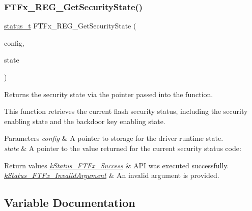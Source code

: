 \subsubsection{\texorpdfstring{FTFx\_REG\_GetSecurityState()}{FTFx\_REG\_GetSecurityState()}}
{\footnotesize\ttfamily \mbox{\hyperlink{group__ksdk__common_gaaabdaf7ee58ca7269bd4bf24efcde092}{status\+\_\+t}} F\+T\+Fx\+\_\+\+R\+E\+G\+\_\+\+Get\+Security\+State (\begin{DoxyParamCaption}\item[{\mbox{\hyperlink{group__ftfx__controller_gab0196063c05bffb4cd2f249699a3378c}{ftfx\+\_\+config\+\_\+t}} $\ast$}]{config,  }\item[{\mbox{\hyperlink{group__ftfx__controller_gae49df85d158f3651e17d1bb660a4f1c2}{ftfx\+\_\+security\+\_\+state\+\_\+t}} $\ast$}]{state }\end{DoxyParamCaption})}



Returns the security state via the pointer passed into the function. 

This function retrieves the current flash security status, including the security enabling state and the backdoor key enabling state.


\begin{DoxyParams}{Parameters}
{\em config} & A pointer to storage for the driver runtime state. \\
\hline
{\em state} & A pointer to the value returned for the current security status code\+:\\
\hline
\end{DoxyParams}

\begin{DoxyRetVals}{Return values}
{\em \mbox{\hyperlink{group__ftfx__controller_gga458e651af6690959efa2afb96be7d609a8825e5cb3b30edfd6a26897eef4c66a3}{k\+Status\+\_\+\+F\+T\+Fx\+\_\+\+Success}}} & A\+PI was executed successfully. \\
\hline
{\em \mbox{\hyperlink{group__ftfx__controller_gga458e651af6690959efa2afb96be7d609a88aadd667559399a26dcb825bf0b8d3e}{k\+Status\+\_\+\+F\+T\+Fx\+\_\+\+Invalid\+Argument}}} & An invalid argument is provided. \\
\hline
\end{DoxyRetVals}


\subsection{Variable Documentation}
\mbox{\label{group__ftfx__controller_ga0523cedff47e2441fc198b7770ec5d3f}} 
